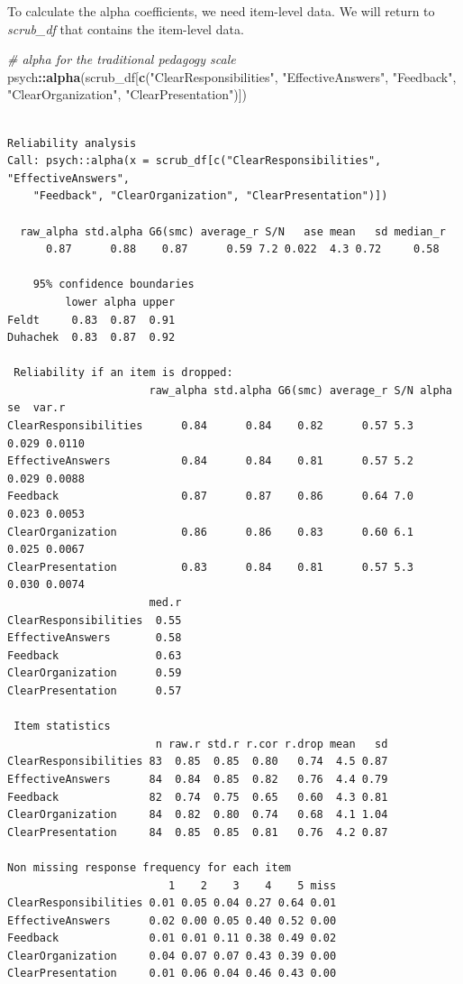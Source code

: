 \documentclass[
  11pt,
]{book}
\newenvironment{Shaded}{\begin{snugshade}}{\end{snugshade}}
\newcommand{\CommentTok}[1]{\textcolor[rgb]{0.37,0.37,0.37}{\textit{#1}}}
\newcommand{\FunctionTok}[1]{\textcolor[rgb]{0.27,0.27,0.27}{\textbf{#1}}}
\newcommand{\NormalTok}[1]{#1}
\newcommand{\SpecialCharTok}[1]{\textcolor[rgb]{0.43,0.43,0.43}{\textbf{#1}}}
\newcommand{\StringTok}[1]{\textcolor[rgb]{0.5,0.5,0.5}{#1}}
\begin{document}
To calculate the alpha coefficients, we need item-level data. We will return to \emph{scrub\_df} that contains the item-level data.

\begin{Shaded}
\begin{Highlighting}[]
\CommentTok{\# alpha for the traditional pedagogy scale}
\NormalTok{psych}\SpecialCharTok{::}\FunctionTok{alpha}\NormalTok{(scrub\_df[}\FunctionTok{c}\NormalTok{(}\StringTok{"ClearResponsibilities"}\NormalTok{, }\StringTok{"EffectiveAnswers"}\NormalTok{, }\StringTok{"Feedback"}\NormalTok{,}
    \StringTok{"ClearOrganization"}\NormalTok{, }\StringTok{"ClearPresentation"}\NormalTok{)])}
\end{Highlighting}
\end{Shaded}

\begin{verbatim}

Reliability analysis   
Call: psych::alpha(x = scrub_df[c("ClearResponsibilities", "EffectiveAnswers", 
    "Feedback", "ClearOrganization", "ClearPresentation")])

  raw_alpha std.alpha G6(smc) average_r S/N   ase mean   sd median_r
      0.87      0.88    0.87      0.59 7.2 0.022  4.3 0.72     0.58

    95% confidence boundaries 
         lower alpha upper
Feldt     0.83  0.87  0.91
Duhachek  0.83  0.87  0.92

 Reliability if an item is dropped:
                      raw_alpha std.alpha G6(smc) average_r S/N alpha se  var.r
ClearResponsibilities      0.84      0.84    0.82      0.57 5.3    0.029 0.0110
EffectiveAnswers           0.84      0.84    0.81      0.57 5.2    0.029 0.0088
Feedback                   0.87      0.87    0.86      0.64 7.0    0.023 0.0053
ClearOrganization          0.86      0.86    0.83      0.60 6.1    0.025 0.0067
ClearPresentation          0.83      0.84    0.81      0.57 5.3    0.030 0.0074
                      med.r
ClearResponsibilities  0.55
EffectiveAnswers       0.58
Feedback               0.63
ClearOrganization      0.59
ClearPresentation      0.57

 Item statistics 
                       n raw.r std.r r.cor r.drop mean   sd
ClearResponsibilities 83  0.85  0.85  0.80   0.74  4.5 0.87
EffectiveAnswers      84  0.84  0.85  0.82   0.76  4.4 0.79
Feedback              82  0.74  0.75  0.65   0.60  4.3 0.81
ClearOrganization     84  0.82  0.80  0.74   0.68  4.1 1.04
ClearPresentation     84  0.85  0.85  0.81   0.76  4.2 0.87

Non missing response frequency for each item
                         1    2    3    4    5 miss
ClearResponsibilities 0.01 0.05 0.04 0.27 0.64 0.01
EffectiveAnswers      0.02 0.00 0.05 0.40 0.52 0.00
Feedback              0.01 0.01 0.11 0.38 0.49 0.02
ClearOrganization     0.04 0.07 0.07 0.43 0.39 0.00
ClearPresentation     0.01 0.06 0.04 0.46 0.43 0.00
\end{verbatim}
\end{document}
